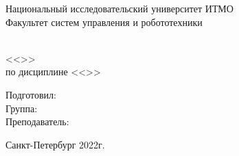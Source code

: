 \thispagestyle{empty}
\begin{center}
    Национальный исследовательский университет ИТМО\\
    Факультет систем управления и робототехники
    \vskip 7cm

    \Huge \workType                         \\
    \huge <<\workName>>                     \\
    \Large по дисциплине <<\subjectName>>   \\
\end{center}
\vfill

\begin{flushright}
    Подготовил: \authorName         \\
    Группа: \groupNumber            \\
    Преподаватель: \teacherName     \\
\end{flushright}
\vskip 2cm

\begin{center}
    Санкт-Петербург 2022г.
\end{center}
\newpage